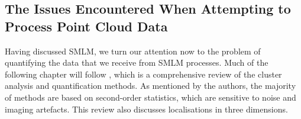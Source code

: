 \documentclass[11pt]{article}
\begin{document}





\subsection{The Issues Encountered When Attempting to Process Point Cloud Data}


Having discussed SMLM, we turn our attention now to the problem of quantifying the data that we receive from SMLM processes. Much of the following chapter will follow \cite{Lelek2021}, which is a comprehensive review of the cluster analysis and quantification methods. As mentioned by the authors, the majority of methods are based on second-order statistics\cite{Lelek2021}, which are sensitive to noise and imaging artefacts. This review also discusses localisations in three dimensions.  \\
\end{document}
